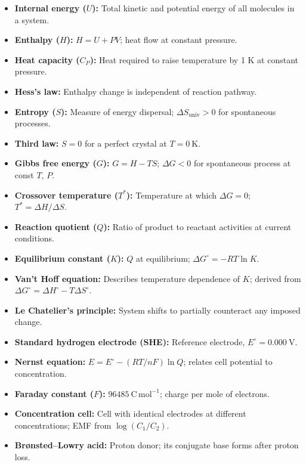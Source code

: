 \documentclass[12pt,a4paper]{article}
\begin{document}
\begin{tcolorbox}[defbox, title={One-Line Definitions}]
\begin{itemize}[leftmargin=*, itemsep=2pt, topsep=2pt]
  \item \textbf{Internal energy ($U$):} Total kinetic and potential energy of all molecules in a system.
  \item \textbf{Enthalpy ($H$):} $H = U + PV$; heat flow at constant pressure.
  \item \textbf{Heat capacity ($C_P$):} Heat required to raise temperature by 1 K at constant pressure.
  \item \textbf{Hess's law:} Enthalpy change is independent of reaction pathway.
  \item \textbf{Entropy ($S$):} Measure of energy dispersal; $\Delta S_{\mathrm{univ}} > 0$ for spontaneous processes.
  \item \textbf{Third law:} $S = 0$ for a perfect crystal at $T = 0\ \mathrm{K}$.
  \item \textbf{Gibbs free energy ($G$):} $G = H - TS$; $\Delta G < 0$ for spontaneous process at const $T$, $P$.
  \item \textbf{Crossover temperature ($T^*$):} Temperature at which $\Delta G = 0$; $T^* = \Delta H/\Delta S$.
  \item \textbf{Reaction quotient ($Q$):} Ratio of product to reactant activities at current conditions.
  \item \textbf{Equilibrium constant ($K$):} $Q$ at equilibrium; $\Delta G^\circ = -RT\ln K$.
  \item \textbf{Van't Hoff equation:} Describes temperature dependence of $K$; derived from $\Delta G^\circ = \Delta H^\circ - T\Delta S^\circ$.
  \item \textbf{Le Chatelier's principle:} System shifts to partially counteract any imposed change.
  \item \textbf{Standard hydrogen electrode (SHE):} Reference electrode, $E^\circ = 0.000\ \mathrm{V}$.
  \item \textbf{Nernst equation:} $E = E^\circ - (RT/nF)\ln Q$; relates cell potential to concentration.
  \item \textbf{Faraday constant ($F$):} $96485\ \mathrm{C\,mol^{-1}}$; charge per mole of electrons.
  \item \textbf{Concentration cell:} Cell with identical electrodes at different concentrations; EMF from $\log(C_1/C_2)$.
  \item \textbf{Brønsted--Lowry acid:} Proton donor; its conjugate base forms after proton loss.

\end{itemize}
\end{tcolorbox}
\end{document}
